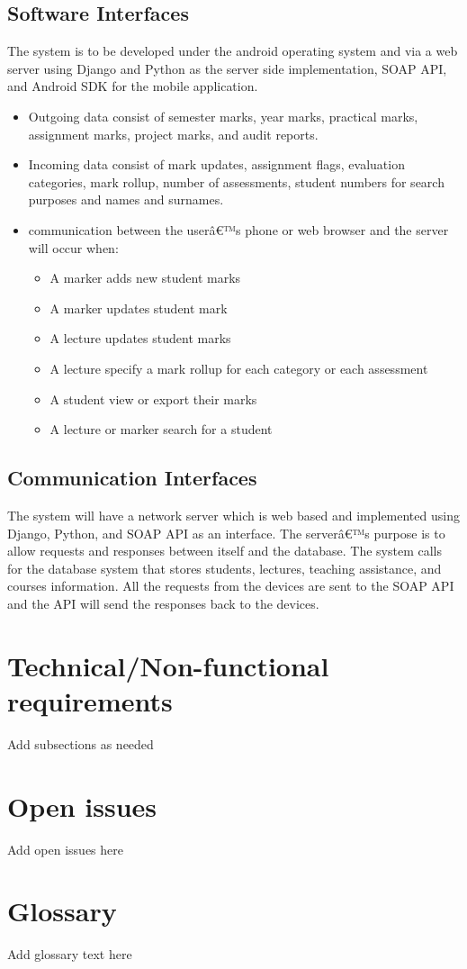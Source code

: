 \documentclass[10pt,a4paper]{article}
\begin{document}
\subsection{Software Interfaces}
\label{Software Interfaces}

The system is to be developed under the android operating system and via a web server using Django and Python as the server side implementation, SOAP API, and Android SDK for the mobile application.
\begin{itemize}
\item Outgoing data consist of semester marks, year marks, practical marks, assignment marks, project marks, and audit reports.
\item Incoming data consist of mark updates, assignment flags, evaluation categories, mark rollup, number of assessments, student numbers for search purposes and names and surnames.

\item communication between the userâ€™s phone or web browser and the server will occur when:

\begin{itemize}
\item A marker adds new student marks
\item A marker updates student mark
\item A lecture updates student marks
\item A lecture specify a mark rollup for each category or each assessment
\item A student view or export their marks
\item A lecture or marker search for a student

\end{itemize}
\end{itemize}

\subsection{Communication Interfaces}
\label{Communication Interfaces}
The system will have a network server which is web based and implemented using Django, Python, and SOAP API as an interface.
The serverâ€™s purpose is to allow requests and responses between itself and the database. 
The system calls for the database system that stores students, lectures, teaching assistance, and courses information.
All the requests from the devices are sent to the SOAP API and the API will send the responses back to the devices.

\section{Technical/Non-functional requirements}
Add subsections as needed
\section{Open issues}
Add open issues here
\section{Glossary}
Add glossary text here
\end{document}

